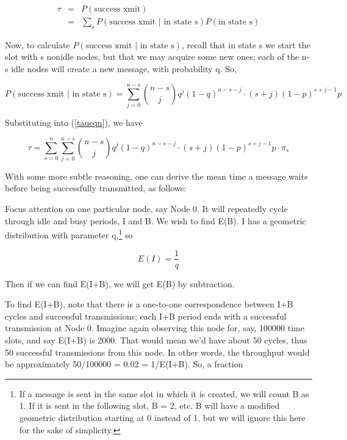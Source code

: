 \begin{eqnarray}
\label{taueqn}
\tau &=& P(\textrm{success xmit})  \\
& = & \sum_{s}P(\textrm{success xmit }|\textrm{ in state s}) P(\textrm{in state s}) \nonumber 
\end{eqnarray}

Now, to calculate $P(\textrm{success xmit }|\textrm{ in state s})$,
recall that in state s we start the slot with s nonidle nodes, but that
we may acquire some new ones; each of the n-s idle nodes will create a
new message, with probability q.  So,

\begin{equation}
P(\textrm{success xmit }|\textrm{ in state s}) = 
\sum_{j=0}^{n-s} \binom{n-s}{j} q^j (1-q)^{n-s-j} \cdot 
(s+j)(1-p)^{s+j-1}p
\end{equation}

Substituting into (\ref{taueqn}), we have

\begin{equation}
\tau = \sum_{s=0}^{n} 
\sum_{j=0}^{n-s} \binom{n-s}{j} q^j (1-q)^{n-s-j} \cdot 
(s+j)(1-p)^{s+j-1}p \cdot
\pi_s
\end{equation}

With some more subtle reasoning, one can derive the mean time a message
waits before being successfully transmitted, as follows:

Focus attention on one particular node, say Node 0.  It will repeatedly
cycle through idle and busy periods, I and B.  We wish to find E(B).  I
has a geometric distribution with parameter q,\footnote{If a message is
sent in the same slot in which it is created, we will count B as 1.  If
it is sent in the following slot, B = 2, etc.  B will have a modified
geometric distribution starting at 0 instead of 1, but we will ignore
this here for the sake of simplicity.} so

\begin{equation}
\label{ei}
E(I)=\frac{1}{q}
\end{equation}

Then if we can find E(I+B), we will get E(B) by subtraction.

To find E(I+B), note that there is a one-to-one correspondence between
I+B cycles and successful transmissions; each I+B period ends with a
successful transmission at Node 0.  Imagine again observing this node
for, say, 100000 time slots, and say E(I+B) is 2000.  That would mean
we'd have about 50 cycles, thus 50 successful transmissions from this
node.
In other words, the throughput would be approximately 50/100000 = 0.02 =
1/E(I+B).  So, a fraction

